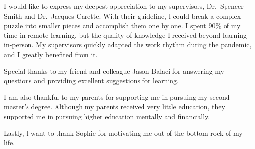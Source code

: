 
I would like to express my deepest appreciation to my supervisors, Dr.\ Spencer Smith and Dr.\ Jacques Carette. With their guideline, I could break a complex puzzle into smaller pieces and accomplish them one by one. I spent 90\% of my time in remote learning, but the quality of knowledge I received beyond learning in-person. My supervisors quickly adapted the work rhythm during the pandemic, and I greatly benefited from it.

Special thanks to my friend and colleague Jason Balaci for answering my questions and providing excellent suggestions for learning.

I am also thankful to my parents for supporting me in pursuing my second master's degree. Although my parents received very little education, they supported me in pursuing higher education mentally and financially.

Lastly, I want to thank Sophie for motivating me out of the bottom rock of my life. 